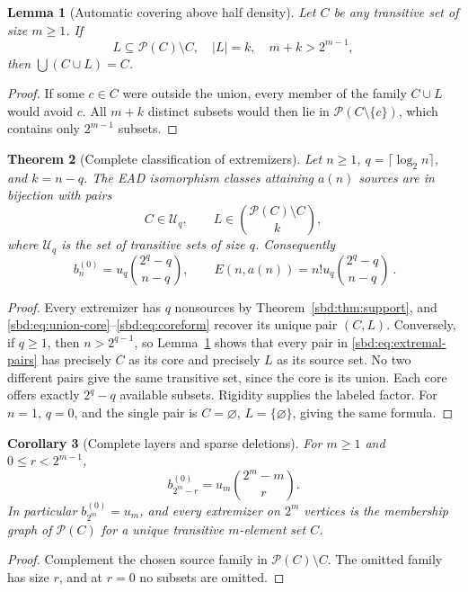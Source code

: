 \documentclass[11pt,a4paper]{article}
\newtheorem{theorem}{Theorem}[section]
\newtheorem{lemma}[theorem]{Lemma}
\newtheorem{corollary}[theorem]{Corollary}
\theoremstyle{definition}
\newcommand{\PP}{\mathcal P}
\newcommand{\U}{\mathcal U}
\begin{document}
\begin{lemma}[Automatic covering above half density]\label{sbd:lem:auto}
Let $C$ be any transitive set of size $m\ge1$. If
\[
 L\subseteq\PP(C)\setminus C,\quad |L|=k,\quad m+k>2^{m-1},
\]
then $\bigcup(C\cup L)=C$.
\end{lemma}
\begin{proof}
If some $c\in C$ were outside the union, every member of the family
$C\cup L$ would avoid $c$. All $m+k$ distinct subsets would then lie in
$\PP(C\setminus\{c\})$, which contains only $2^{m-1}$ subsets.
\end{proof}

\begin{theorem}[Complete classification of extremizers]\label{sbd:thm:classify}
Let $n\ge1$, $q=\lceil\log_2n\rceil$, and $k=n-q$.
The EAD isomorphism classes attaining $a(n)$ sources are in bijection
with pairs
\begin{equation}\label{sbd:eq:extremal-pairs}
 C\in\U_q,\qquad L\in\binom{\PP(C)\setminus C}{k},
\end{equation}
where $\U_q$ is the set of transitive sets of size $q$.
Consequently
\begin{equation}\label{sbd:eq:extremal-count}
 \boxed{\ b_n^{(0)}=u_q\binom{2^q-q}{n-q},\qquad
 E(n,a(n))=n!u_q\binom{2^q-q}{n-q}\ }.
\end{equation}
\end{theorem}
\begin{proof}
Every extremizer has $q$ nonsources by Theorem~\ref{sbd:thm:support}, and
\eqref{sbd:eq:union-core}--\eqref{sbd:eq:coreform} recover its unique pair $(C,L)$.
Conversely, if $q\ge1$, then $n>2^{q-1}$, so Lemma~\ref{sbd:lem:auto}
shows that every pair in \eqref{sbd:eq:extremal-pairs} has precisely $C$ as
its core and precisely $L$ as its source set. No two different pairs give
the same transitive set, since the core is its union. Each core offers
exactly $2^q-q$ available subsets. Rigidity supplies the labeled factor.
For $n=1$, $q=0$, and the single pair is
$C=\varnothing$, $L=\{\varnothing\}$, giving the same formula.
\end{proof}

\begin{corollary}[Complete layers and sparse deletions]\label{sbd:cor:power}
For $m\ge1$ and $0\le r<2^{m-1}$,
\begin{equation}\label{sbd:eq:deletions}
 b_{2^m-r}^{(0)}=u_m\binom{2^m-m}{r}.
\end{equation}
In particular $b_{2^m}^{(0)}=u_m$, and every extremizer on $2^m$ vertices
is the membership graph of $\PP(C)$ for a unique transitive $m$-element
set $C$.
\end{corollary}
\begin{proof}
Complement the chosen source family in $\PP(C)\setminus C$.
The omitted family has size $r$, and at $r=0$ no subsets are omitted.
\end{proof}
\end{document}
